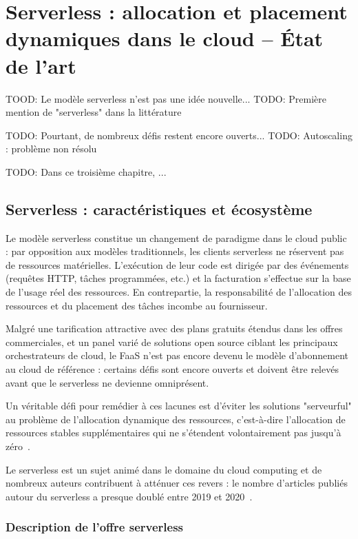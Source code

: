 \chapter{Serverless : allocation et placement dynamiques dans le cloud -- État de l'art}
\label{chapter:sota}

TOOD: Le modèle serverless n'est pas une idée nouvelle...
TODO: Première mention de "serverless" dans la littérature~\cite{andersonServerlessNetworkFile}

TODO: Pourtant, de nombreux défis restent encore ouverts...
TODO: Autoscaling : problème non résolu~\cite{straesserWhyItNot2022}

TODO: Dans ce troisième chapitre, ...

\section{Serverless : caractéristiques et écosystème}

Le modèle serverless constitue un changement de paradigme dans le cloud public : par opposition aux modèles traditionnels, les clients serverless ne réservent pas de ressources matérielles. L'exécution de leur code est dirigée par des événements (requêtes HTTP, tâches programmées, etc.) et la facturation s'effectue sur la base de l'usage réel des ressources. En contrepartie, la responsabilité de l'allocation des ressources et du placement des tâches incombe au fournisseur.

Malgré une tarification attractive avec des plans gratuits étendus dans les offres commerciales, et un panel varié de solutions open source ciblant les principaux orchestrateurs de cloud, le FaaS n'est pas encore devenu le modèle d'abonnement au cloud de référence : certains défis sont encore ouverts et doivent être relevés avant que le serverless ne devienne omniprésent.

Un véritable défi pour remédier à ces lacunes est d'éviter les solutions "serveurful" au problème de l'allocation dynamique des ressources, c'est-à-dire l'allocation de ressources stables supplémentaires qui ne s'étendent volontairement pas jusqu'à zéro~\cite{hellersteinServerlessComputingOne2019}.

Le serverless est un sujet animé dans le domaine du cloud computing et de nombreux auteurs contribuent à atténuer ces revers : le nombre d'articles publiés autour du serverless a presque doublé entre 2019 et 2020~\cite{hassanSurveyServerlessComputing2021}.

\subsection{Description de l'offre serverless}

